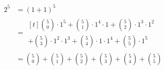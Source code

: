 \begin{align*}
2^5 &= (1+1)^5 \\
&= \begin{multlined}[t]
\binom50\cdot 1^5 + \binom51\cdot 1^4 \cdot 1
  + \binom52\cdot 1^3 \cdot 1^2 \\
+ \binom53\cdot 1^2 \cdot 1^3 + \binom54\cdot 1 \cdot 1^4
  + \binom55\cdot 1^5
\end{multlined} \\
&= \binom50 + \binom51 + \binom52 + \binom53 + \binom54 + \binom55
\end{align*}
